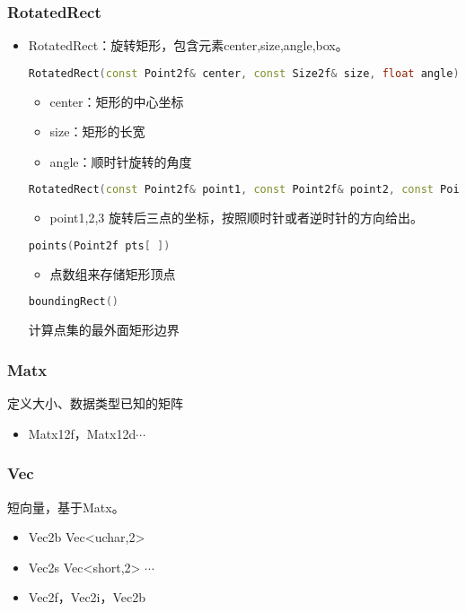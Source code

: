 \documentclass[12pt]{article}
\begin{document}
\subsubsection{RotatedRect}
\begin{itemize}
\item RotatedRect：旋转矩形，包含元素center,size,angle,box。


\begin{lstlisting}[language=C++]
RotatedRect(const Point2f& center, const Size2f& size, float angle)
\end{lstlisting}
		\begin{itemize}
		\item center：矩形的中心坐标
		\item size：矩形的长宽
		\item angle：顺时针旋转的角度
		\end{itemize}
\begin{lstlisting}[language=C++]
RotatedRect(const Point2f& point1, const Point2f& point2, const Point2f& point3)
\end{lstlisting}
		\begin{itemize}
		\item point1,2,3 \quad 旋转后三点的坐标，按照顺时针或者逆时针的方向给出。
		\end{itemize}
\begin{lstlisting}[language=C++]
points(Point2f pts[ ])
\end{lstlisting}
		\begin{itemize}
		\item 点数组来存储矩形顶点
		\end{itemize}
\begin{lstlisting}[language=C++]
 boundingRect()
 \end{lstlisting}
 计算点集的最外面矩形边界

\end{itemize}

\subsubsection{Matx}
定义大小、数据类型已知的矩阵
\begin{itemize}
\item Matx12f，Matx12d$\cdots$
\end{itemize}

\subsubsection{Vec}
短向量，基于Matx。
\begin{itemize}
\item Vec2b \quad Vec<uchar,2>
\item Vec2s \quad Vec<short,2>
$\cdots$
\item Vec2f，Vec2i，Vec2b
\end{itemize}
\end{document}
